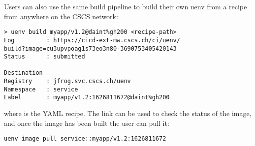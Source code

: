 Users can also use the same build pipeline to build their own uenv from a recipe from anywhere on the CSCS network:
\begin{lstlisting}
> uenv build myapp/v1.2@daint%gh200 <recipe-path>
Log         : https://cicd-ext-mw.cscs.ch/ci/uenv/
build?image=cu3upvpoag1s73eo3n80-3690753405420143
Status      : submitted

Destination
Registry    : jfrog.svc.cscs.ch/uenv
Namespace   : service
Label       : myapp/v1.2:1626811672@daint%gh200
\end{lstlisting}
where  is the YAML recipe.
The link can be used to check the status of the image, and once the image has been built the user can pull it:
\begin{lstlisting}
uenv image pull service::myapp/v1.2:1626811672
\end{lstlisting}


